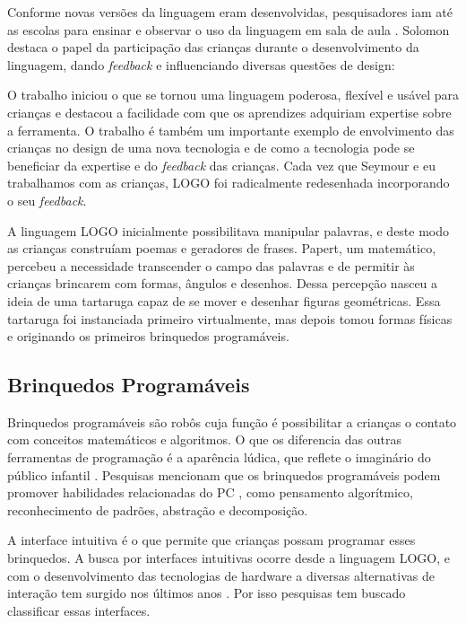 Conforme novas versões da linguagem eram desenvolvidas, pesquisadores iam até as escolas para ensinar e observar o uso da linguagem em sala de aula \cite{bers_coding_2018}. Solomon destaca o papel da participação das crianças durante o desenvolvimento da linguagem, dando \textit{feedback} e influenciando diversas questões de design:

\begin{citacao}
O trabalho iniciou o que se tornou uma linguagem poderosa, flexível e usável para crianças e destacou a facilidade com que os aprendizes adquiriam expertise sobre a ferramenta. O trabalho é também um importante exemplo de envolvimento das crianças no design de uma nova tecnologia e de como a tecnologia pode se beneficiar da expertise e do \textit{feedback} das crianças. Cada vez que Seymour e eu trabalhamos com as crianças, LOGO foi radicalmente redesenhada incorporando o seu \textit{feedback}.
\end{citacao}

A linguagem LOGO inicialmente possibilitava manipular palavras, e deste modo as crianças construíam poemas e geradores de frases. Papert, um matemático, percebeu a necessidade transcender o campo das palavras e de permitir às crianças brincarem com formas, ângulos e desenhos. Dessa percepção nasceu a ideia de uma tartaruga capaz de se mover e desenhar figuras geométricas. Essa tartaruga foi instanciada primeiro virtualmente, mas depois tomou formas físicas e originando os primeiros brinquedos programáveis.

\subsection{Brinquedos Programáveis}
\label{brinquedos_programaveis}
Brinquedos programáveis são robôs cuja função é possibilitar a crianças o contato com conceitos matemáticos e algoritmos. O que os diferencia das outras ferramentas de programação é a aparência lúdica, que reflete o imaginário do público infantil \cite{raabe_rope_2017}. Pesquisas mencionam que os brinquedos programáveis podem promover habilidades relacionadas do \ac{PC} \cite{repiso_robotics_2019, bers_coding_2018, pugnali_impact_2017,  bers_computational_2014}, como pensamento algorítmico, reconhecimento de padrões, abstração e decomposição.

A interface intuitiva é o que permite que crianças possam programar esses brinquedos. A busca por interfaces intuitivas ocorre desde a linguagem LOGO, e com o desenvolvimento das tecnologias de hardware a diversas alternativas de interação tem surgido nos últimos anos \cite{catlin_edurobots_2018}. Por isso pesquisas tem buscado classificar essas interfaces.


